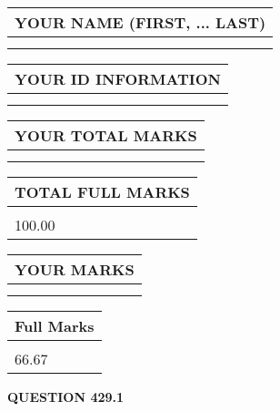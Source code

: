 \documentclass{ctexart}
\begin{document}
   
   
   
\newpage 
\setcounter{page}{ 
   429001 } 
   
   
   
   
\noindent\begin{tabular}{|l|}
\hline
YOUR NAME (FIRST, ... LAST)  \\
\hline
 \\ 
 \\ 
\hline
\end{tabular}
\hspace{0.05in} \begin{tabular}{|l|}
\hline
 YOUR   ID   INFORMATION  \\
\hline
 \\ 
 \\ 
\hline
\end{tabular}
   
   
\vspace{0.2in}\noindent\begin{tabular}{|l|}
\hline
YOUR TOTAL MARKS  \\
\hline
 \\ 
 \\ 
\hline
\end{tabular}
\hspace{0.05in} \begin{tabular}{|l|}
\hline
TOTAL FULL MARKS  \\
\hline
 \\ 
100.00 \\
\hline
\end{tabular}
   
   
 \vspace{0.2in}
 
 
 
 
   
   
  
\vspace{0.2in}
  
\noindent\begin{tabular}{|l|}
\hline
 YOUR MARKS  \\
\hline
 \\ 
 \\ 
\hline
\end{tabular}
\hspace{0.05in} \begin{tabular}{|l|}
\hline
 Full Marks  \\
\hline
 \\ 
66.67 \\
\hline
\end{tabular}
{\textbf{\Large{QUESTION
429.1 
}}}
  
\end{document}
